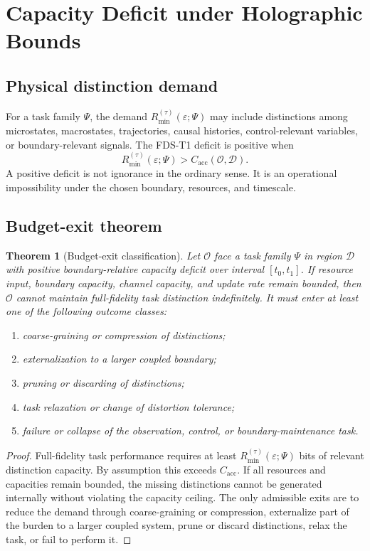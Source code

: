 \documentclass[10pt,a4paper,twocolumn,aps,prl]{revtex4-2}
\newtheorem{theorem}{Theorem}
\newcommand{\Obs}{\mathcal{O}}
\newcommand{\Patch}{\mathcal{D}}
\begin{document}
\section{Capacity Deficit under Holographic Bounds}

\subsection{Physical distinction demand}

For a task family $\Psi$, the demand $R_{\min}^{(\tau)}(\varepsilon;\Psi)$ may include distinctions among microstates, macrostates, trajectories, causal histories, control-relevant variables, or boundary-relevant signals. The FDS-T1 deficit is positive when
\begin{equation}
R_{\min}^{(\tau)}(\varepsilon;\Psi)>C_{\mathrm{acc}}(\Obs,\Patch).
\end{equation}
A positive deficit is not ignorance in the ordinary sense. It is an operational impossibility under the chosen boundary, resources, and timescale.

\subsection{Budget-exit theorem}

\begin{theorem}[Budget-exit classification]
Let $\Obs$ face a task family $\Psi$ in region $\Patch$ with positive boundary-relative capacity deficit over interval $[t_0,t_1]$. If resource input, boundary capacity, channel capacity, and update rate remain bounded, then $\Obs$ cannot maintain full-fidelity task distinction indefinitely. It must enter at least one of the following outcome classes:
\begin{enumerate}
    \item coarse-graining or compression of distinctions;
    \item externalization to a larger coupled boundary;
    \item pruning or discarding of distinctions;
    \item task relaxation or change of distortion tolerance;
    \item failure or collapse of the observation, control, or boundary-maintenance task.
\end{enumerate}
\end{theorem}

\begin{proof}
Full-fidelity task performance requires at least $R_{\min}^{(\tau)}(\varepsilon;\Psi)$ bits of relevant distinction capacity. By assumption this exceeds $C_{\mathrm{acc}}$. If all resources and capacities remain bounded, the missing distinctions cannot be generated internally without violating the capacity ceiling. The only admissible exits are to reduce the demand through coarse-graining or compression, externalize part of the burden to a larger coupled system, prune or discard distinctions, relax the task, or fail to perform it.
\end{proof}
\end{document}
